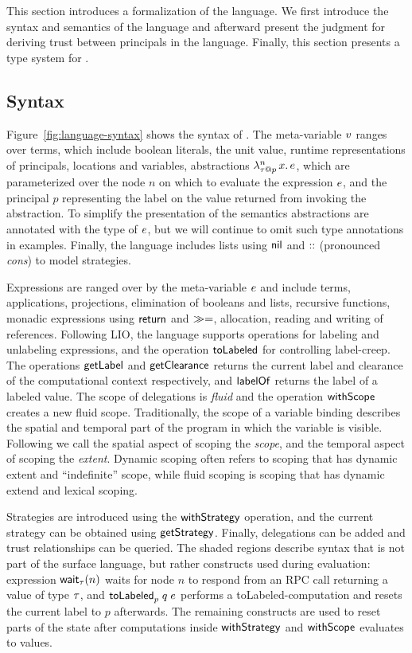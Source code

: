 This section introduces a formalization of the \lang{} language. We first introduce the syntax and semantics of the language and afterward present the judgment for deriving trust between principals in the language. Finally, this section presents a type system for \lang. 

\subsection{Syntax}
Figure~\ref{fig:language-syntax} shows the syntax of \lang. The meta-variable $v$ ranges over terms, which include boolean literals, the unit value, runtime representations of principals, locations and variables, abstractions $\lambda^{n}_{\tau \mathbin{@} p}\,x.\,e$, which are parameterized over the node $n$ on which to evaluate the expression $e$, and the principal $p$ representing the label on the value returned from invoking the abstraction. To simplify the presentation of the semantics abstractions are annotated with the type of $e$, but we will continue to omit such type annotations in examples. Finally, the language includes lists using $\mathsf{nil}$ and $\mathbin{::}$ (pronounced \emph{cons}) to model strategies.

Expressions are ranged over by the meta-variable $e$ and include terms, applications, projections, elimination of booleans and lists, recursive functions, monadic expressions using $\mathsf{return}$ and $\gg=$, allocation, reading and writing of references. Following LIO, the language supports operations for labeling and unlabeling expressions, and the operation $\mathsf{toLabeled}$ for controlling label-creep. The operations $\mathsf{getLabel}$ and $\mathsf{getClearance}$ returns the current label and clearance of the computational context respectively, and $\mathsf{labelOf}$ returns the label of a labeled value. The scope of delegations is \emph{fluid} \cite{Moore:2016:EAC:2983990.2984021} and the operation $\mathsf{withScope}$ creates a new fluid scope. Traditionally, the scope of a variable binding describes the spatial and temporal part of the program in which the variable is visible. Following \cite{Moore:2016:EAC:2983990.2984021} we call the spatial aspect of scoping the \emph{scope}, and the temporal aspect of scoping the \emph{extent}. Dynamic scoping often refers to scoping that has dynamic extent and ``indefinite'' scope, while fluid scoping is scoping that has dynamic extend and lexical scoping.

Strategies are introduced using the $\mathsf{withStrategy}$ operation, and the current strategy can be obtained using $\mathsf{getStrategy}$. Finally, delegations can be added and trust relationships can be queried. The shaded regions describe syntax that is not part of the surface language, but rather constructs used during evaluation: expression $\wait{n}[\type]$ waits for node $n$ to respond from an RPC call returning a value of type $\tau$, and $\internalTolabeled{p}{q}{\expr}$ performs a toLabeled-computation and resets the current label to $p$ afterwards. The remaining constructs are used to reset parts of the state after computations inside $\mathsf{withStrategy}$ and $\mathsf{withScope}$ evaluates to values. 

